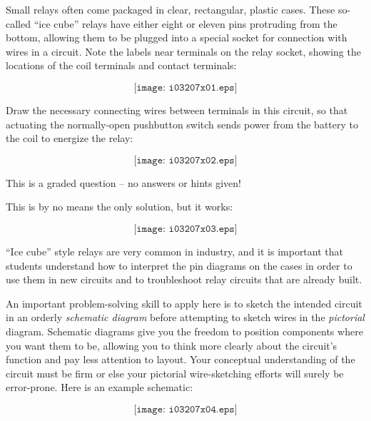 

Small relays often come packaged in clear, rectangular, plastic cases.  These so-called ``ice cube'' relays have either eight or eleven pins protruding from the bottom, allowing them to be plugged into a special socket for connection with wires in a circuit.  Note the labels near terminals on the relay socket, showing the locations of the coil terminals and contact terminals:

$$\texttt{[image: i03207x01.eps]}$$

Draw the necessary connecting wires between terminals in this circuit, so that actuating the normally-open pushbutton switch sends power from the battery to the coil to energize the relay:

\vskip 20pt

$$\texttt{[image: i03207x02.eps]}$$

\vfil 

\eject






This is a graded question -- no answers or hints given!
 






This is by no means the only solution, but it works:

$$\texttt{[image: i03207x03.eps]}$$

``Ice cube'' style relays are very common in industry, and it is important that students understand how to interpret the pin diagrams on the cases in order to use them in new circuits and to troubleshoot relay circuits that are already built.

\vskip 10pt

An important problem-solving skill to apply here is to sketch the intended circuit in an orderly {\it schematic diagram} before attempting to sketch wires in the {\it pictorial} diagram.  Schematic diagrams give you the freedom to position components where you want them to be, allowing you to think more clearly about the circuit's function and pay less attention to layout.  Your conceptual understanding of the circuit must be firm or else your pictorial wire-sketching efforts will surely be error-prone.  Here is an example schematic:

$$\texttt{[image: i03207x04.eps]}$$




